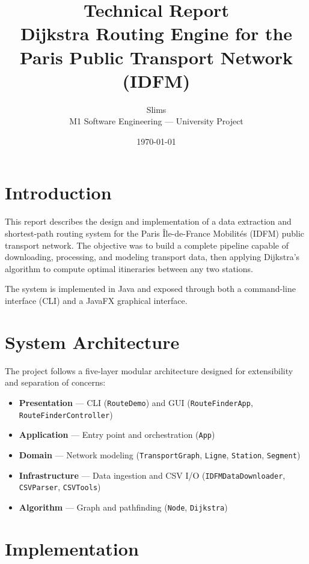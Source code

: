 \documentclass[12pt,a4paper]{article}
\title{\textbf{Technical Report}\\
\large Dijkstra Routing Engine for the Paris Public Transport Network (IDFM)}
\author{Slims \\ M1 Software Engineering --- University Project}
\date{\today}
\begin{document}
\maketitle

\tableofcontents
\newpage

\section{Introduction}

This report describes the design and implementation of a data extraction and shortest-path routing system for the Paris Île-de-France Mobilités (IDFM) public transport network. The objective was to build a complete pipeline capable of downloading, processing, and modeling transport data, then applying Dijkstra's algorithm to compute optimal itineraries between any two stations.

The system is implemented in Java and exposed through both a command-line interface (CLI) and a JavaFX graphical interface.

\section{System Architecture}

The project follows a five-layer modular architecture designed for extensibility and separation of concerns:

\begin{itemize}
    \item \textbf{Presentation} --- CLI (\texttt{RouteDemo}) and GUI (\texttt{RouteFinderApp}, \texttt{RouteFinderController})
    \item \textbf{Application} --- Entry point and orchestration (\texttt{App})
    \item \textbf{Domain} --- Network modeling (\texttt{TransportGraph}, \texttt{Ligne}, \texttt{Station}, \texttt{Segment})
    \item \textbf{Infrastructure} --- Data ingestion and CSV I/O (\texttt{IDFMDataDownloader}, \texttt{CSVParser}, \texttt{CSVTools})
    \item \textbf{Algorithm} --- Graph and pathfinding (\texttt{Node}, \texttt{Dijkstra})
\end{itemize}

\section{Implementation}
\end{document}
